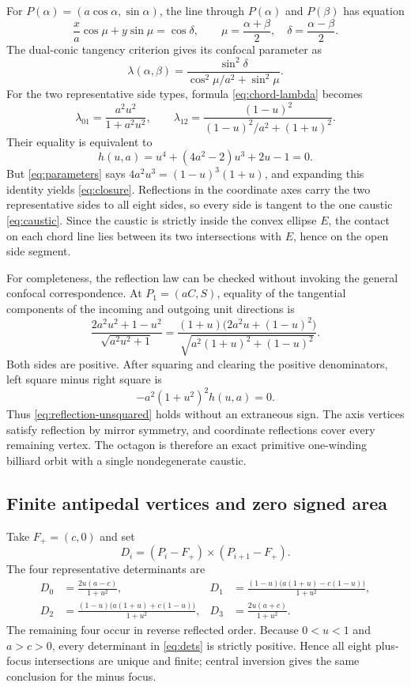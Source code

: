 \documentclass[11pt,a4paper]{amsart}
\theoremstyle{definition}
\theoremstyle{remark}
\newcommand{\cross}{\mathbin{\times}}
\begin{document}
For $P(\alpha)=(a\cos\alpha,\sin\alpha)$, the line through
$P(\alpha)$ and $P(\beta)$ has equation
\[
 \frac{x}{a}\cos\mu+y\sin\mu=\cos\delta,
 \qquad
 \mu=\frac{\alpha+\beta}{2},\quad
 \delta=\frac{\alpha-\beta}{2}.
\]
The dual-conic tangency criterion gives its confocal parameter as
\begin{equation}\label{eq:chord-lambda}
 \lambda(\alpha,\beta)
 =\frac{\sin^2\delta}{\cos^2\mu/a^2+\sin^2\mu}.
\end{equation}
For the two representative side types, formula \eqref{eq:chord-lambda}
becomes
\[
 \lambda_{01}=\frac{a^2u^2}{1+a^2u^2},
 \qquad
 \lambda_{12}=\frac{(1-u)^2}{(1-u)^2/a^2+(1+u)^2}.
\]
Their equality is equivalent to
\begin{equation}\label{eq:closure}
 h(u,a)=u^4+(4a^2-2)u^3+2u-1=0.
\end{equation}
But \eqref{eq:parameters} says
$4a^2u^3=(1-u)^3(1+u)$, and expanding this identity yields
\eqref{eq:closure}.  Reflections in the coordinate axes carry the two
representative sides to all eight sides, so every side is tangent to the one
caustic \eqref{eq:caustic}.  Since the caustic is strictly inside the convex
ellipse $E$, the contact on each chord line lies between its two intersections
with $E$, hence on the open side segment.

For completeness, the reflection law can be checked without invoking the
general confocal correspondence.  At $P_1=(aC,S)$, equality of the tangential
components of the incoming and outgoing unit directions is
\begin{equation}\label{eq:reflection-unsquared}
 \frac{2a^2u^2+1-u^2}{\sqrt{a^2u^2+1}}
 =\frac{(1+u)\bigl(2a^2u+(1-u)^2\bigr)}
 {\sqrt{a^2(1+u)^2+(1-u)^2}}.
\end{equation}
Both sides are positive.  After squaring and clearing the positive
denominators, left square minus right square is
\[
 -a^2(1+u^2)^2h(u,a)=0.
\]
Thus \eqref{eq:reflection-unsquared} holds without an extraneous sign.  The
axis vertices satisfy reflection by mirror symmetry, and coordinate
reflections cover every remaining vertex.  The octagon is therefore an exact
primitive one-winding billiard orbit with a single nondegenerate caustic.

\subsection*{Finite antipedal vertices and zero signed area}

Take $F_+=(c,0)$ and set
\[
 D_i=(P_i-F_+)\cross(P_{i+1}-F_+).
\]
The four representative determinants are
\begin{align}
D_0&=\frac{2u(a-c)}{1+u^2},
&D_1&=\frac{(1-u)\bigl(a(1+u)-c(1-u)\bigr)}{1+u^2},\label{eq:dets}\\
D_2&=\frac{(1-u)\bigl(a(1+u)+c(1-u)\bigr)}{1+u^2},
&D_3&=\frac{2u(a+c)}{1+u^2}.
\end{align}
The remaining four occur in reverse reflected order.  Because
$0<u<1$ and $a>c>0$, every determinant in \eqref{eq:dets} is strictly
positive.  Hence all eight plus-focus intersections are unique and finite;
central inversion gives the same conclusion for the minus focus.
\end{document}
